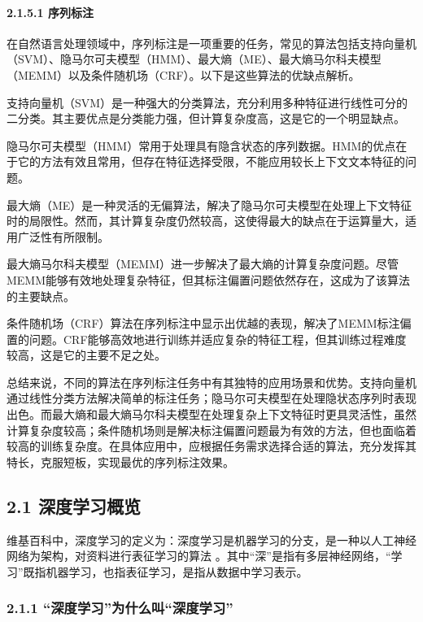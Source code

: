 \paragraph{\texorpdfstring{\textbf{2.1.5.1
序列标注}}{2.1.5.1 序列标注}}\label{2151-ux5e8fux5217ux6807ux6ce8}

在自然语言处理领域中，序列标注是一项重要的任务，常见的算法包括支持向量机（SVM）、隐马尔可夫模型（HMM）、最大熵（ME）、最大熵马尔科夫模型（MEMM）以及条件随机场（CRF）。以下是这些算法的优缺点解析。

支持向量机（SVM）是一种强大的分类算法，充分利用多种特征进行线性可分的二分类。其主要优点是分类能力强，但计算复杂度高，这是它的一个明显缺点。

隐马尔可夫模型（HMM）常用于处理具有隐含状态的序列数据。HMM的优点在于它的方法有效且常用，但存在特征选择受限，不能应用较长上下文文本特征的问题。

最大熵（ME）是一种灵活的无偏算法，解决了隐马尔可夫模型在处理上下文特征时的局限性。然而，其计算复杂度仍然较高，这使得最大的缺点在于运算量大，适用广泛性有所限制。

最大熵马尔科夫模型（MEMM）进一步解决了最大熵的计算复杂度问题。尽管MEMM能够有效地处理复杂特征，但其标注偏置问题依然存在，这成为了该算法的主要缺点。

条件随机场（CRF）算法在序列标注中显示出优越的表现，解决了MEMM标注偏置的问题。CRF能够高效地进行训练并适应复杂的特征工程，但其训练过程难度较高，这是它的主要不足之处。

总结来说，不同的算法在序列标注任务中有其独特的应用场景和优势。支持向量机通过线性分类方法解决简单的标注任务；隐马尔可夫模型在处理隐状态序列时表现出色。而最大熵和最大熵马尔科夫模型在处理复杂上下文特征时更具灵活性，虽然计算复杂度较高；条件随机场则是解决标注偏置问题最为有效的方法，但也面临着较高的训练复杂度。在具体应用中，应根据任务需求选择合适的算法，充分发挥其特长，克服短板，实现最优的序列标注效果。

\subsection{\texorpdfstring{\textbf{2.1
深度学习概览}}{2.1 深度学习概览}}\label{21-ux6df1ux5ea6ux5b66ux4e60ux6982ux89c8}

维基百科中，深度学习的定义为：深度学习是机器学习的分支，是一种以人工神经网络为架构，对资料进行表征学习的算法
。其中``深''是指有多层神经网络，``学习''既指机器学习，也指表征学习，是指从数据中学习表示。

\subsubsection{\texorpdfstring{\textbf{2.1.1
``深度学习''为什么叫``深度学习''}}{2.1.1 ``深度学习''为什么叫``深度学习''}}\label{211-ux6df1ux5ea6ux5b66ux4e60ux4e3aux4ec0ux4e48ux53ebux6df1ux5ea6ux5b66ux4e60}

